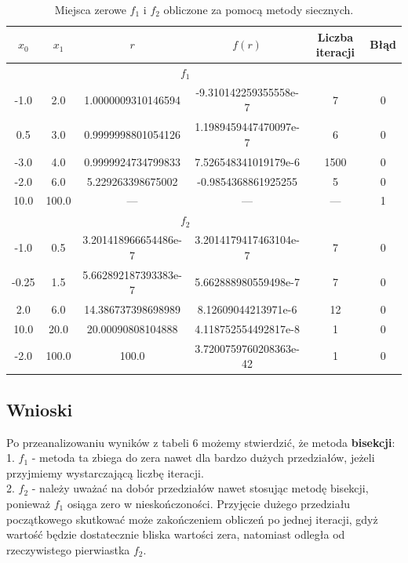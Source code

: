 \documentclass[10pt,a4paper, polish]{article}
\begin{document}
\begin{table}[H]
        \centering
        \footnotesize
\begin{tabular}{c|c|c|c|c|c}
$x_0$&$x_1$& {$r$} & {$f(r)$} & Liczba iteracji & Błąd \\ \hline
\multicolumn{5}{c}{$f_1$} \\ \hline
-1.0&2.0&1.0000009310146594&-9.310142259355558e-7&7&0 \\
0.5&3.0&0.9999998801054126&1.1989459447470097e-7&6&0 \\
-3.0&4.0&0.9999924734799833&7.526548341019179e-6&1500&0 \\
-2.0&6.0&5.229263398675002&-0.9854368861925255&5&0 \\
10.0&100.0&{---}&{---}&{---}&1 \\ \hline
\multicolumn{5}{c}{$f_2$} \\ \hline
-1.0&0.5&3.201418966654486e-7&3.2014179417463104e-7&7&0 \\
-0.25&1.5&5.662892187393383e-7&5.662888980559498e-7&7&0 \\
2.0&6.0&14.386737398698989&8.12609044213971e-6&12&0 \\
10.0&20.0&20.00090808104888&4.118752554492817e-8&1&0 \\
-2.0&100.0&100.0&3.7200759760208363e-42&1&0 \\

\end{tabular}
\caption{Miejsca zerowe $f_1$ i $f_2$ obliczone za pomocą metody siecznych.}
\label{table:5}
\end{table}

\subsection*{Wnioski}

Po przeanalizowaniu wyników z tabeli 6 możemy stwierdzić, że metoda \textbf{bisekcji}:\\
1. \textbf{$f_1$} - metoda ta zbiega do zera nawet dla bardzo dużych przedziałów, jeżeli przyjmiemy wystarczającą liczbę iteracji.\\
2. \textbf{$f_2$} - należy uważać na dobór przedziałów nawet stosując metodę bisekcji, ponieważ $f_1$ osiąga zero w nieskończoności. Przyjęcie dużego przedziału początkowego skutkować może zakończeniem obliczeń po jednej iteracji, gdyż wartość będzie dostatecznie bliska wartości zera, natomiast odległa od rzeczywistego pierwiastka $f_2$. \\\\
\end{document}
